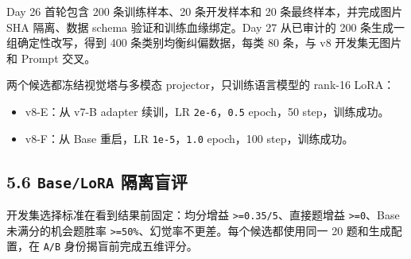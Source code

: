 \documentclass[UTF8,fontset=fandol,a4paper,11pt]{ctexart}
\providecommand{\tightlist}{\setlength{\itemsep}{0pt}\setlength{\parskip}{0pt}}
\begin{document}
Day 26 首轮包含 200 条训练样本、20 条开发样本和 20
条最终样本，并完成图片 SHA 隔离、数据 schema 验证和训练血缘绑定。Day 27
从已审计的 200 条生成一组确定性改写，得到 400 条类别均衡纠偏数据，每类
80 条，与 v8 开发集无图片和 Prompt 交叉。

两个候选都冻结视觉塔与多模态 projector，只训练语言模型的 rank-16 LoRA：

\begin{itemize}
\tightlist
\item
  v8-E：从 v7-B adapter 续训，LR \nolinkurl{2e-6}，\nolinkurl{0.5}
  epoch，50 step，训练成功。
\item
  v8-F：从 Base 重启，LR \nolinkurl{1e-5}，\nolinkurl{1.0} epoch，100
  step，训练成功。
\end{itemize}

\subsection{\texorpdfstring{{5.6 \nolinkurl{Base/LoRA} 隔离盲评}}{5.6  隔离盲评}}\label{baselora-ux9694ux79bbux76f2ux8bc4}

开发集选择标准在看到结果前固定：均分增益
\nolinkurl{>=0.35/5}、直接题增益 \nolinkurl{>=0}、Base
未满分的机会题胜率 \nolinkurl{>=50%}、幻觉率不更差。每个候选都使用同一
20 题和生成配置，在 {\nolinkurl{A/B}} 身份揭盲前完成五维评分。

\Needspace{195pt}
\end{document}
